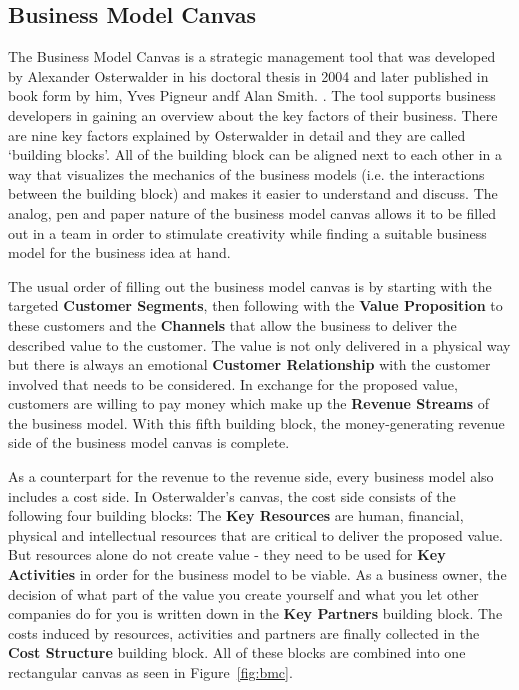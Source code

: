 	\subsection{Business Model Canvas} 
	\label{sec:bmc}
		The Business Model Canvas is a strategic management tool that was developed by Alexander Osterwalder in his doctoral thesis in 2004 and later published in book form by him, Yves Pigneur andf Alan Smith. \cite{osterwalder}. The tool supports business developers in gaining an overview about the key factors of their business. There are nine key factors explained by Osterwalder in detail and they are called `building blocks'. All of the building block can be aligned next to each other in a way that visualizes the mechanics of the business models (i.e. the interactions between the building block) and makes it easier to understand and discuss. The analog, pen and paper nature of the business model canvas allows it to be filled out in a team in order to stimulate creativity while finding a suitable business model for the business idea at hand.

		The usual order of filling out the business model canvas \cite[video]{bmc} is by starting with the targeted \textbf{Customer Segments}, then following with the \textbf{Value Proposition} to these customers and the \textbf{Channels} that allow the business to deliver the described value to the customer. The value is not only delivered in a physical way but there is always an emotional \textbf{Customer Relationship} with the customer involved that needs to be considered. In exchange for the proposed value, customers are willing to pay money which make up the \textbf{Revenue Streams} of the business model. With this fifth building block, the money-generating revenue side of the business model canvas is complete.

		As a counterpart for the revenue to the revenue side, every business model also includes a cost side. In Osterwalder's canvas, the cost side consists of the following four building blocks: The \textbf{Key Resources} are human, financial, physical and intellectual resources that are critical to deliver the proposed value. But resources alone do not create value - they need to be used for \textbf{Key Activities} in order for the business model to be viable. As a business owner, the decision of what part of the value you create yourself and what you let other companies do for you is written down in the \textbf{Key Partners} building block. The costs induced by resources, activities and partners are finally collected in the \textbf{Cost Structure} building block. All of these blocks are combined into one rectangular canvas as seen in Figure~\ref{fig:bmc}.

